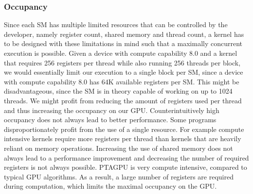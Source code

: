 \subsubsection{Occupancy}
Since each SM has multiple limited resources that can be controlled by the developer, namely register count, shared memory and thread count, a kernel has to be designed with these limitations in mind such that a maximally concurrent execution is possible.
Given a device with compute capability 8.0 and a kernel that requires 256 registers per thread while also running 256 threads per block, we would essentially limit our execution to a single block per SM, since a device with compute capability 8.0 has 64K available registers per SM.
This might be disadvantageous, since the SM is in theory capable of working on up to 1024 threads.
We might profit from reducing the amount of registers used per thread and thus increasing the occupancy on our GPU.
Counterintuitively high occupancy does not always lead to better performance. Some programs disproportionately profit from the use of a single resource.
For example compute intensive kernels require more registers per thread than kernels that are heavily reliant on memory operations. Increasing the use of shared memory does not always lead to a performance improvement and decreasing the number of required registers is not always possible.
PTAGPU is very compute intensive, compared to typical GPU algorithms.
As a result, a large number of registers are required during computation, which limits the maximal occupancy on the GPU.
